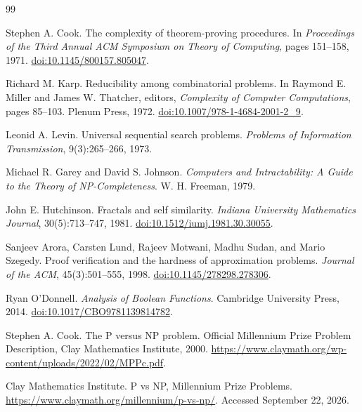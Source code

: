 \documentclass[11pt]{article}
\theoremstyle{plain}
\theoremstyle{definition}
\begin{document}
\begin{thebibliography}{99}

Stephen A. Cook.
\newblock The complexity of theorem-proving procedures.
\newblock In \emph{Proceedings of the Third Annual ACM Symposium on Theory of Computing}, pages 151--158, 1971.
\newblock \href{https://doi.org/10.1145/800157.805047}{doi:10.1145/800157.805047}.

Richard M. Karp.
\newblock Reducibility among combinatorial problems.
\newblock In Raymond E. Miller and James W. Thatcher, editors, \emph{Complexity of Computer Computations}, pages 85--103. Plenum Press, 1972.
\newblock \href{https://doi.org/10.1007/978-1-4684-2001-2_9}{doi:10.1007/978-1-4684-2001-2\_9}.

Leonid A. Levin.
\newblock Universal sequential search problems.
\newblock \emph{Problems of Information Transmission}, 9(3):265--266, 1973.

Michael R. Garey and David S. Johnson.
\newblock \emph{Computers and Intractability: A Guide to the Theory of NP-Completeness}.
\newblock W. H. Freeman, 1979.

John E. Hutchinson.
\newblock Fractals and self similarity.
\newblock \emph{Indiana University Mathematics Journal}, 30(5):713--747, 1981.
\newblock \href{https://doi.org/10.1512/iumj.1981.30.30055}{doi:10.1512/iumj.1981.30.30055}.

Sanjeev Arora, Carsten Lund, Rajeev Motwani, Madhu Sudan, and Mario Szegedy.
\newblock Proof verification and the hardness of approximation problems.
\newblock \emph{Journal of the ACM}, 45(3):501--555, 1998.
\newblock \href{https://doi.org/10.1145/278298.278306}{doi:10.1145/278298.278306}.

Ryan O'Donnell.
\newblock \emph{Analysis of Boolean Functions}.
\newblock Cambridge University Press, 2014.
\newblock \href{https://doi.org/10.1017/CBO9781139814782}{doi:10.1017/CBO9781139814782}.

Stephen A. Cook.
\newblock The P versus NP problem.
\newblock Official Millennium Prize Problem Description, Clay Mathematics Institute, 2000.
\newblock \url{https://www.claymath.org/wp-content/uploads/2022/02/MPPc.pdf}.

Clay Mathematics Institute.
\newblock P vs NP, Millennium Prize Problems.
\newblock \url{https://www.claymath.org/millennium/p-vs-np/}.
\newblock Accessed September 22, 2026.

\end{thebibliography}
\end{document}
